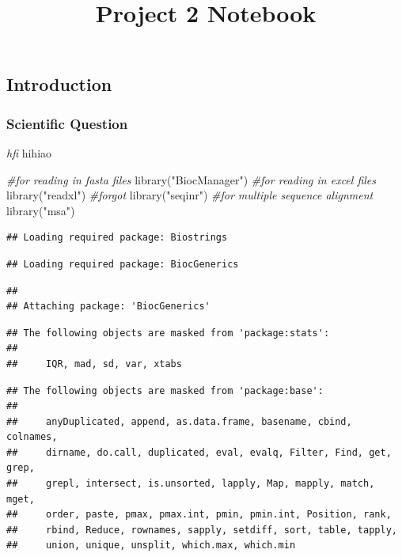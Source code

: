 \documentclass[
]{article}
\title{Project 2 Notebook}
\author{}
\date{\vspace{-2.5em}}
\newenvironment{Shaded}{\begin{snugshade}}{\end{snugshade}}
\newcommand{\CommentTok}[1]{\textcolor[rgb]{0.56,0.35,0.01}{\textit{#1}}}
\newcommand{\FunctionTok}[1]{\textcolor[rgb]{0.00,0.00,0.00}{#1}}
\newcommand{\NormalTok}[1]{#1}
\newcommand{\StringTok}[1]{\textcolor[rgb]{0.31,0.60,0.02}{#1}}
\begin{document}
\maketitle

\hypertarget{introduction}{%
\subsection{Introduction}\label{introduction}}

\hypertarget{scientific-question}{%
\subsubsection{Scientific Question}\label{scientific-question}}

\emph{hfi} hihiao

\begin{Shaded}
\begin{Highlighting}[]
\CommentTok{\#for reading in fasta files}
\FunctionTok{library}\NormalTok{(}\StringTok{"BiocManager"}\NormalTok{)}
\CommentTok{\#for reading in excel files}
\FunctionTok{library}\NormalTok{(}\StringTok{"readxl"}\NormalTok{)}
\CommentTok{\#forgot}
\FunctionTok{library}\NormalTok{(}\StringTok{"seqinr"}\NormalTok{)}
\CommentTok{\#for multiple sequence alignment }
\FunctionTok{library}\NormalTok{(}\StringTok{"msa"}\NormalTok{)}
\end{Highlighting}
\end{Shaded}

\begin{verbatim}
## Loading required package: Biostrings
\end{verbatim}

\begin{verbatim}
## Loading required package: BiocGenerics
\end{verbatim}

\begin{verbatim}
## 
## Attaching package: 'BiocGenerics'
\end{verbatim}

\begin{verbatim}
## The following objects are masked from 'package:stats':
## 
##     IQR, mad, sd, var, xtabs
\end{verbatim}

\begin{verbatim}
## The following objects are masked from 'package:base':
## 
##     anyDuplicated, append, as.data.frame, basename, cbind, colnames,
##     dirname, do.call, duplicated, eval, evalq, Filter, Find, get, grep,
##     grepl, intersect, is.unsorted, lapply, Map, mapply, match, mget,
##     order, paste, pmax, pmax.int, pmin, pmin.int, Position, rank,
##     rbind, Reduce, rownames, sapply, setdiff, sort, table, tapply,
##     union, unique, unsplit, which.max, which.min
\end{verbatim}
\end{document}
